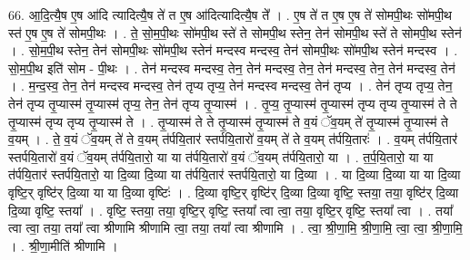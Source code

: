 \documentclass[17pt]{extarticle}
\begin{document}
66. आ॒दि॒त्यै॒ष ए॒ष आ॑दि त्यादित्यै॒ष ते॑ त ए॒ष आ॑दित्यादित्यै॒ष ते᳚ । . ए॒ष ते॑ त ए॒ष ए॒ष ते॑ सोमपी॒थः सो॑मपी॒थ स्त॑ ए॒ष ए॒ष ते॑ सोमपी॒थः । . ते॒ सो॒म॒पी॒थः सो॑मपी॒थ स्ते॑ ते सोमपी॒थ स्तेन॒ तेन॑ सोमपी॒थ स्ते॑ ते सोमपी॒थ स्तेन॑ । . सो॒म॒पी॒थ स्तेन॒ तेन॑ सोमपी॒थः सो॑मपी॒थ स्तेन॑ मन्दस्व मन्दस्व॒ तेन॑ सोमपी॒थः सो॑मपी॒थ 
स्तेन॑ मन्दस्व । . सो॒म॒पी॒थ इति॑ सोम - पी॒थः । . तेन॑ मन्दस्व मन्दस्व॒ तेन॒ तेन॑ मन्दस्व॒ तेन॒ तेन॑ मन्दस्व॒ तेन॒ तेन॑ मन्दस्व॒ तेन॑ । . म॒न्द॒स्व॒ तेन॒ तेन॑ मन्दस्व मन्दस्व॒ तेन॑ तृप्य तृप्य॒ तेन॑ मन्दस्व मन्दस्व॒ तेन॑ तृप्य । . तेन॑ तृप्य तृप्य॒ तेन॒ तेन॑ तृप्य तृ॒प्यास्म॑ तृ॒प्यास्म॑ तृप्य॒ तेन॒ तेन॑ तृप्य तृ॒प्यास्म॑ । . तृ॒प्य॒ तृ॒प्यास्म॑ तृ॒प्यास्म॑ तृप्य तृप्य तृ॒प्यास्म॑ ते ते तृ॒प्यास्म॑ तृप्य तृप्य तृ॒प्यास्म॑ ते । . तृ॒प्यास्म॑ ते ते तृ॒प्यास्म॑ तृ॒प्यास्म॑ ते व॒यं ॅव॒यम् ते॑ तृ॒प्यास्म॑ तृ॒प्यास्म॑ ते व॒यम् । . ते॒ व॒यं ॅव॒यम् ते॑ ते व॒यम् त॑र्पयि॒तार॑ स्तर्पयि॒तारो॑ व॒यम् ते॑ ते व॒यम् त॑र्पयि॒तारः॑ । . व॒यम् त॑र्पयि॒तार॑ स्तर्पयि॒तारो॑ व॒यं ॅव॒यम् त॑र्पयि॒तारो॒ या या त॑र्पयि॒तारो॑ व॒यं ॅव॒यम् त॑र्पयि॒तारो॒ या । . त॒र्प॒यि॒तारो॒ या या त॑र्पयि॒तार॑ स्तर्पयि॒तारो॒ या दि॒व्या दि॒व्या या त॑र्पयि॒तार॑ स्तर्पयि॒तारो॒ या दि॒व्या । . या दि॒व्या दि॒व्या या या दि॒व्या वृष्टि॒र् वृष्टि॑र् दि॒व्या या या दि॒व्या वृष्टिः॑ । . दि॒व्या वृष्टि॒र् वृष्टि॑र् दि॒व्या दि॒व्या वृष्टि॒ स्तया॒ तया॒ वृष्टि॑र् दि॒व्या दि॒व्या वृष्टि॒ स्तया᳚ । . वृष्टि॒ स्तया॒ तया॒ वृष्टि॒र् वृष्टि॒ स्तया᳚ त्वा त्वा॒ तया॒ वृष्टि॒र् वृष्टि॒ स्तया᳚ त्वा । . तया᳚ त्वा त्वा॒ तया॒ तया᳚ त्वा श्रीणामि श्रीणामि त्वा॒ तया॒ तया᳚ त्वा श्रीणामि । . त्वा॒ श्री॒णा॒मि॒ श्री॒णा॒मि॒ त्वा॒ त्वा॒ श्री॒णा॒मि॒ । . श्री॒णा॒मीति॑ श्रीणामि । \newline
\pagebreak
{}
\end{document}
